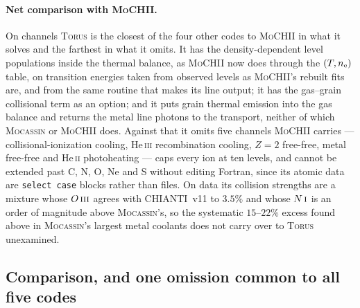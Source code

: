 \documentclass[english,a4paper]{my_memo}
\newcommand{\code}[1]{\texttt{#1}}
\newcommand{\MoCHII}{\textsc{MoCHII}}
\newcommand{\Mocassin}{\textsc{Mocassin}}
\newcommand{\Torus}{\textsc{Torus}}
\newcommand{\HeII}{He\,\textsc{ii}}
\newcommand{\HeIII}{He\,\textsc{iii}}
\newcommand{\OIII}{O\,\textsc{iii}}
\newcommand{\NI}{N\,\textsc{i}}
\newcommand{\nel}{n_{\rm e}}
\begin{document}
\paragraph{Net comparison with \MoCHII{}.}  On channels \Torus{} is the closest
of the four other codes to \MoCHII{} in what it solves and the farthest in what
it omits.  It has the density-dependent level populations inside the thermal
balance, as \MoCHII{} now does through the $(T, \nel)$ table, on transition
energies taken from observed levels as \MoCHII{}'s rebuilt fits are, and from
the same routine that makes its line output; it has the gas--grain collisional
term as an option; and it puts
grain thermal emission into the gas balance and returns the metal line photons
to the transport, neither of which \Mocassin{} or \MoCHII{} does.  Against that
it omits five channels \MoCHII{} carries ---
collisional-ionization cooling, \HeIII{} recombination cooling, $Z = 2$
free-free, metal free-free and \HeII{} photoheating --- caps every ion at ten
levels, and cannot be extended past C, N, O, Ne and S without editing Fortran,
since its atomic data are \code{select case} blocks rather than files.  On data
its collision strengths are a mixture whose $\OIII{}$ agrees with CHIANTI~v11
to $3.5\%$ and whose $\NI{}$ is an order of magnitude above \Mocassin{}'s, so
the systematic $15$--$22\%$ excess found above in \Mocassin{}'s largest metal
coolants does not carry over to \Torus{} unexamined.

\subsection{Comparison, and one omission common to all five codes}
\end{document}
